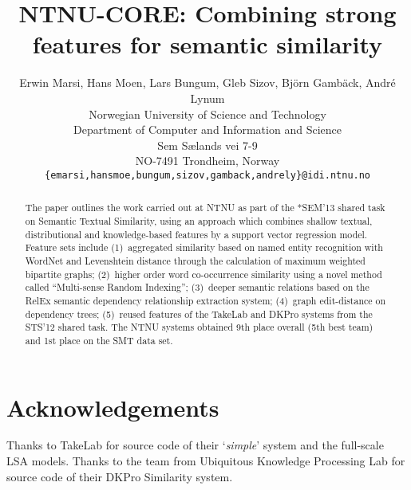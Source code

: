 \documentclass[11pt,letterpaper]{article}
\title{NTNU-CORE: Combining strong features for semantic similarity}
\author{Erwin Marsi, Hans Moen, Lars Bungum, Gleb Sizov, Bj\"orn Gamb\"ack, Andr\'e Lynum\\
  Norwegian University of Science and Technology\\
  Department of Computer and Information and Science\\
  Sem S{\ae}lands vei 7-9 \\
  NO-7491 Trondheim, Norway \\
  {\tt \{emarsi,hansmoe,bungum,sizov,gamback,andrely\}@idi.ntnu.no}}
\date{}
\begin{document}
\maketitle
\begin{abstract}
The paper outlines the work carried out at NTNU as part of the 
*SEM'13 shared task on Semantic Textual Similarity,
using an approach which combines shallow textual, distributional 
and knowledge-based features by a support vector regression model. 
Feature sets include 
(1)~aggregated similarity based on named entity recognition with WordNet and
Levenshtein distance through the calculation of maximum weighted bipartite graphs; 
(2)~higher order word co-occurrence similarity using a novel method called 
``Multi-sense Random Indexing''; 
(3)~deeper semantic relations based on the RelEx semantic dependency relationship extraction system; 
(4)~graph edit-distance on dependency trees; 
(5)~reused features of the TakeLab and DKPro systems from the STS'12 shared task. 
The NTNU systems obtained 9th place overall (5th best team) and 1st place on the SMT data set.
\end{abstract}

















\section*{Acknowledgements}

Thanks to TakeLab for source code of their `\emph{simple\/}' system and the full-scale LSA models. 
Thanks to the team from Ubiquitous Knowledge Processing Lab for source code of their DKPro Similarity system.

\vfill
\pagebreak
\balance



\end{document}
